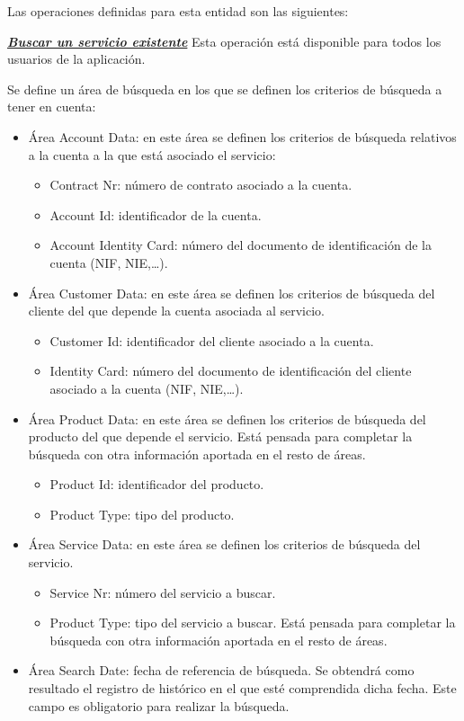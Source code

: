 Las operaciones definidas para esta entidad son las siguientes:


\underline{\textsl{\textbf{Buscar un servicio existente}}}\newline
Esta operación está disponible para todos los usuarios de la aplicación.

Se define un área de búsqueda en los que se definen los criterios de búsqueda a tener en cuenta:
\begin{itemize}
	\item Área Account Data: en este área se definen los criterios de búsqueda relativos a la cuenta a la que está asociado el servicio:
		\begin{itemize}
			\item Contract Nr: número de contrato asociado a la cuenta.
			\item Account Id: identificador de la cuenta.
			\item Account Identity Card: número del documento de identificación de la cuenta (NIF, NIE,\dots).
		\end{itemize}
	\item Área Customer Data: en este área se definen los criterios de búsqueda del cliente del que depende la cuenta asociada al servicio.
		\begin{itemize}
			\item Customer Id: identificador del cliente asociado a la cuenta.
			\item Identity Card: número del documento de identificación del cliente asociado a la cuenta (NIF, NIE,\dots).
		\end{itemize}
	\item Área Product Data: en este área se definen los criterios de búsqueda del producto del que depende el servicio. Está pensada para completar la búsqueda con otra información aportada en el resto de áreas.	
		\begin{itemize}
			\item Product Id: identificador del producto.
			\item Product Type: tipo del producto.
		\end{itemize}
	\item Área Service Data: en este área se definen los criterios de búsqueda del servicio.
		\begin{itemize}
			\item Service Nr: número del servicio a buscar.
			\item Product Type: tipo del servicio a buscar. Está pensada para completar la búsqueda con otra información aportada en el resto de áreas.
		\end{itemize}
	\item Área Search Date: fecha de referencia de búsqueda. Se obtendrá como resultado el registro de histórico en el que esté comprendida dicha fecha. Este campo es obligatorio para realizar la búsqueda.
\end{itemize}

